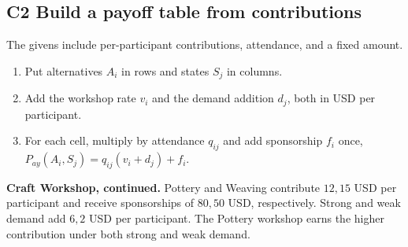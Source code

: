\subsection{C2 \textemdash{} Build a payoff table from contributions}\label{crit:2}
\Cue The givens include per-participant contributions, attendance, and a fixed amount.
\begin{enumerate}
  \item Put alternatives \(A_i\) in rows and states \(S_j\) in columns.
  \item Add the workshop rate \(v_i\) and the demand addition \(d_j\), both in USD per participant.
  \item For each cell, multiply by attendance \(q_{ij}\) and add sponsorship \(f_i\) once,
        \(P_{ay}(A_i,S_j)=q_{ij}(v_i+d_j)+f_i\).
\end{enumerate}
\textbf{Craft Workshop, continued.} Pottery and Weaving contribute \(12,15\) USD per participant and receive sponsorships of \(80,50\) USD, respectively. Strong and weak demand add \(6,2\) USD per participant.
\Decision The Pottery workshop earns the higher contribution under both strong and weak demand.
\par\nobreak\vspace{6pt}

